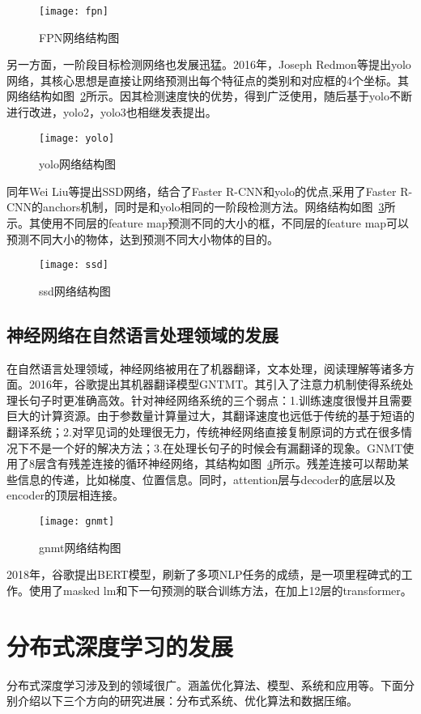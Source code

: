 \begin{figure}[htp]
\centering
\texttt{[image: fpn]}
\caption{FPN网络结构图}
\label{fig:fpn}
\end{figure}
另一方面，一阶段目标检测网络也发展迅猛。2016年，Joseph Redmon等提出yolo网络，其核心思想是直接让网络预测出每个特征点的类别和对应框的4个坐标。其网络结构如图~\ref{fig:yolo}所示。因其检测速度快的优势，得到广泛使用，随后基于yolo不断进行改进，yolo2，yolo3也相继发表提出。

\begin{figure}[htp]
\centering
\texttt{[image: yolo]}
\caption{yolo网络结构图}
\label{fig:yolo}
\end{figure}
同年Wei Liu等提出SSD网络，结合了Faster R-CNN和yolo的优点,采用了Faster R-CNN的anchors机制，同时是和yolo相同的一阶段检测方法。网络结构如图~\ref{fig:ssd}所示。其使用不同层的feature map预测不同的大小的框，不同层的feature map可以预测不同大小的物体，达到预测不同大小物体的目的。

\begin{figure}[htp]
\centering
\texttt{[image: ssd]}
\caption{ssd网络结构图}
\label{fig:ssd}
\end{figure}
\subsection{神经网络在自然语言处理领域的发展}
在自然语言处理领域，神经网络被用在了机器翻译，文本处理，阅读理解等诸多方面。2016年，谷歌提出其机器翻译模型GNTMT。其引入了注意力机制使得系统处理长句子时更准确高效。针对神经网络系统的三个弱点：1.训练速度很慢并且需要巨大的计算资源。由于参数量计算量过大，其翻译速度也远低于传统的基于短语的翻译系统；2.对罕见词的处理很无力，传统神经网络直接复制原词的方式在很多情况下不是一个好的解决方法；3.在处理长句子的时候会有漏翻译的现象。GNMT使用了8层含有残差连接的循环神经网络，其结构如图~\ref{fig:gnmt}所示。残差连接可以帮助某些信息的传递，比如梯度、位置信息。同时，attention层与decoder的底层以及encoder的顶层相连接。

\begin{figure}[htp]
\centering
\texttt{[image: gnmt]}
\caption{gnmt网络结构图}
\label{fig:gnmt}
\end{figure}
2018年，谷歌提出BERT模型，刷新了多项NLP任务的成绩，是一项里程碑式的工作。使用了masked lm和下一句预测的联合训练方法，在加上12层的transformer。
\section{分布式深度学习的发展}
分布式深度学习涉及到的领域很广。涵盖优化算法、模型、系统和应用等。下面分别介绍以下三个方向的研究进展：分布式系统、优化算法和数据压缩。
